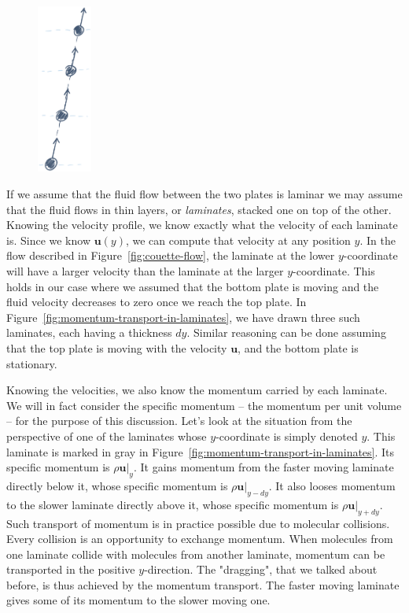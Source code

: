 \documentclass[10pt,twocolumn]{article}
\begin{document}
\begin{figure}
\centering\includegraphics[width=1.8cm]{molecular-collisions.png}
\label{fig:molecular-collisions}
\end{figure}
If we assume that the fluid flow between the two plates is laminar we may assume that the fluid flows in thin layers, or \textit{laminates}, stacked one on top of the other. Knowing the velocity profile, we know exactly what the velocity of each laminate is. Since we know $\mathbf{u}(y)$, we can compute that velocity at any position $y$. In the flow described in Figure~\ref{fig:couette-flow}, the laminate at the lower $y$-coordinate will have a larger velocity than the laminate at the larger $y$-coordinate. This holds in our case where we assumed that the bottom plate is moving and the fluid velocity decreases to zero once we reach the top plate. In Figure~\ref{fig:momentum-transport-in-laminates}, we have drawn three such laminates, each having a thickness $dy$. Similar reasoning can be done assuming that the top plate is moving with the velocity $\mathbf{u}$, and the bottom plate is stationary.

Knowing the velocities, we also know the momentum carried by each laminate. We will in fact consider the specific momentum -- the momentum per unit volume -- for the purpose of this discussion. Let's look at the situation from the perspective of one of the laminates whose $y$-coordinate is simply denoted $y$. This laminate is marked in gray in Figure~\ref{fig:momentum-transport-in-laminates}. Its specific momentum is $\rho \mathbf{u}|_{y}$.  It gains momentum from the faster moving laminate directly below it, whose specific momentum is $\rho \mathbf{u}|_{y-dy}$. It also looses momentum to the slower laminate directly above it, whose specific momentum is $\rho \mathbf{u}|_{y+dy}$. Such transport of momentum is in practice possible due to molecular collisions. Every collision is an opportunity to exchange momentum. When molecules from one laminate collide with molecules from another laminate, momentum can be transported in the positive $y$-direction. The "dragging", that we talked about before, is thus achieved by the momentum transport. The faster moving laminate gives some of its momentum to the slower moving one.
\end{document}
